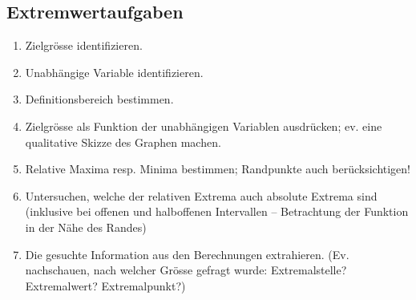 \subsection{Extremwertaufgaben}
\begin{enumerate}
	\item Zielgrösse identifizieren.
	\item Unabhängige Variable identifizieren.
	\item Definitionsbereich bestimmen.
	\item Zielgrösse als Funktion der unabhängigen Variablen ausdrücken; ev. eine qualitative Skizze des Graphen machen.
	\item Relative Maxima resp. Minima bestimmen; Randpunkte auch berücksichtigen!
	\item Untersuchen, welche der relativen Extrema auch absolute Extrema sind (inklusive bei offenen und halboffenen Intervallen – Betrachtung der Funktion in der Nähe des Randes)
	\item Die gesuchte Information aus den Berechnungen extrahieren. (Ev. nachschauen, nach welcher Grösse gefragt wurde: Extremalstelle? Extremalwert? Extremalpunkt?)
\end{enumerate}